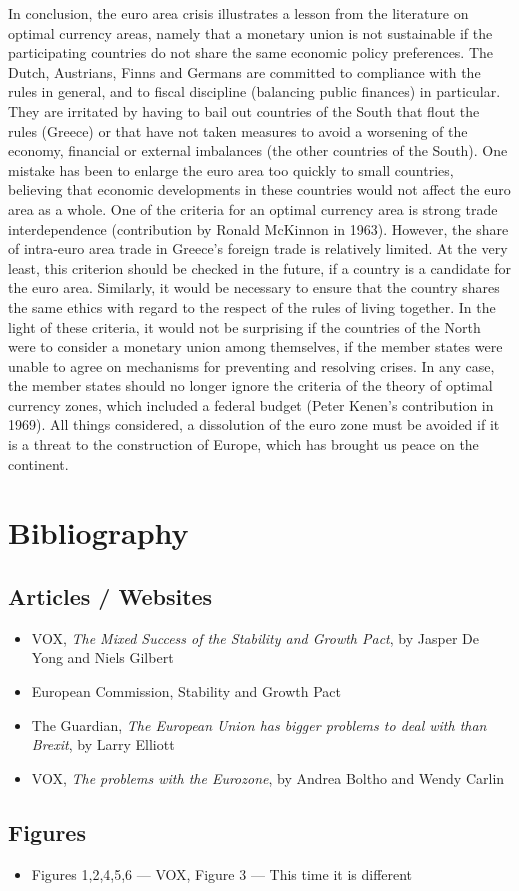 \documentclass[12pt]{article}
\begin{document}
In conclusion, the euro area crisis illustrates a lesson from the literature on optimal currency areas, namely that a monetary union is not sustainable if the participating countries do not share the same economic policy preferences. The Dutch, Austrians, Finns and Germans are committed to compliance with the rules in general, and to fiscal discipline (balancing public finances) in particular. They are irritated by having to bail out countries of the South that flout the rules (Greece) or that have not taken measures to avoid a worsening of the economy, financial or external imbalances (the other countries of the South). One mistake has been to enlarge the euro area too quickly to small countries, believing that economic developments in these countries would not affect the euro area as a whole. One of the criteria for an optimal currency area is strong trade interdependence (contribution by Ronald McKinnon in 1963). However, the share of intra-euro area trade in Greece's foreign trade is relatively limited. At the very least, this criterion should be checked in the future, if a country is a candidate for the euro area. Similarly, it would be necessary to ensure that the country shares the same ethics with regard to the respect of the rules of living together. In the light of these criteria, it would not be surprising if the countries of the North were to consider a monetary union among themselves, if the member states were unable to agree on mechanisms for preventing and resolving crises. In any case, the member states should no longer ignore the criteria of the theory of optimal currency zones, which included a federal budget (Peter Kenen's contribution in 1969). All things considered, a dissolution of the euro zone must be avoided if it is a threat to the construction of Europe, which has brought us peace on the continent.


\section{Bibliography}
\subsection{Articles / Websites}
\begin{itemize}
\item VOX,\textit{ The Mixed Success of the Stability and Growth Pact}, by Jasper De Yong and Niels Gilbert
\item European Commission, Stability and Growth Pact
\item The Guardian, \textit{The European Union has bigger problems to deal with than Brexit}, by Larry Elliott
\item VOX, \textit{The problems with the Eurozone}, by Andrea Boltho and Wendy Carlin
\end{itemize}

\subsection{Figures}
\begin{itemize}
\item Figures 1,2,4,5,6 --- VOX, Figure 3 --- This time it is different
\end{itemize}
\end{document}
